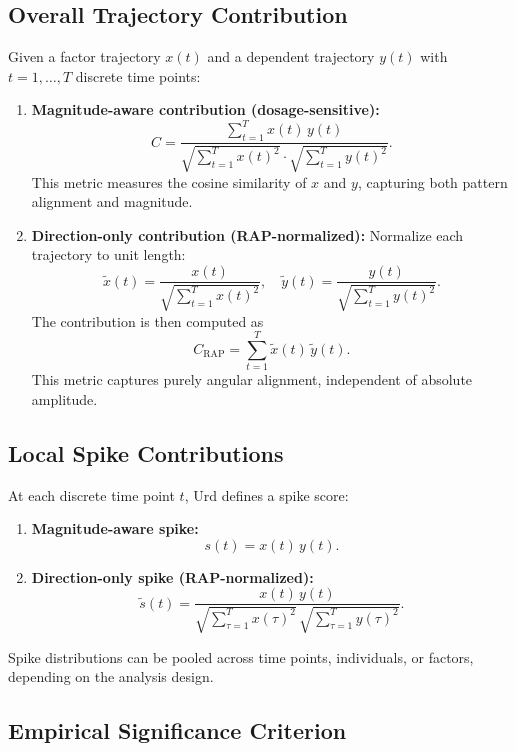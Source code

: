 \documentclass{article}
\begin{document}
\subsection{Overall Trajectory Contribution}

Given a factor trajectory $x(t)$ and a dependent trajectory $y(t)$ with $t=1,\dots,T$ discrete time points:

\begin{enumerate}
    \item \textbf{Magnitude-aware contribution (dosage-sensitive):}
    \[
        C = \frac{\sum_{t=1}^T x(t) \, y(t)}{\sqrt{\sum_{t=1}^T x(t)^2} \cdot \sqrt{\sum_{t=1}^T y(t)^2}}.
    \]
    This metric measures the cosine similarity of $x$ and $y$, capturing both pattern alignment and magnitude.

    \item \textbf{Direction-only contribution (RAP-normalized):}
    Normalize each trajectory to unit length:
    \[
        \tilde{x}(t) = \frac{x(t)}{\sqrt{\sum_{t=1}^T x(t)^2}}, 
        \quad
        \tilde{y}(t) = \frac{y(t)}{\sqrt{\sum_{t=1}^T y(t)^2}}.
    \]
    The contribution is then computed as
    \[
        C_{\text{RAP}} = \sum_{t=1}^T \tilde{x}(t) \, \tilde{y}(t).
    \]
    This metric captures purely angular alignment, independent of absolute amplitude.
\end{enumerate}

\subsection{Local Spike Contributions}

At each discrete time point $t$, Urd defines a spike score:

\begin{enumerate}
    \item \textbf{Magnitude-aware spike:}
    \[
        s(t) = x(t)\,y(t).
    \]
    \item \textbf{Direction-only spike (RAP-normalized):}
    \[
        \tilde{s}(t) = \frac{x(t)\,y(t)}{\sqrt{\sum_{\tau=1}^T x(\tau)^2}\,\sqrt{\sum_{\tau=1}^T y(\tau)^2}}.
    \]
\end{enumerate}

Spike distributions can be pooled across time points, individuals, or factors, depending on the analysis design.

\subsection{Empirical Significance Criterion}
\end{document}
